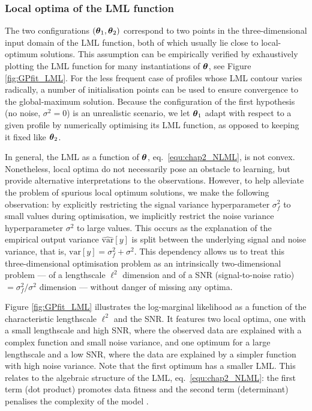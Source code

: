       \subsubsection{Local optima of the LML function}
	The two configurations $(\boldsymbol{\theta}_1, \boldsymbol{\theta}_2)$ correspond to two points
	in the three-dimensional input domain
	of the LML function, both of which usually lie close to local-optimum
	solutions. This assumption can be empirically verified by exhaustively
	plotting the LML function for many instantiations of $\boldsymbol{\theta}$, see Figure
	\ref{fig:GPfit_LML}. For the less frequent case of profiles whose LML contour varies radically, a number of
	initialisation points can be used to ensure convergence to the
	global-maximum solution. Because the configuration of the first
	hypothesis (no noise, $\sigma^2=0$) is an unrealistic scenario, we
	let $\boldsymbol{\theta}_1$ adapt with respect to a given profile by numerically optimising its LML function,
	as opposed to keeping it fixed like $\boldsymbol{\theta}_2$.

	In general, the LML as a function of $\boldsymbol{\theta}$, eq.~\eqref{equ:chap2_NLML}, is not convex.
	Nonetheless, local optima do not necessarily pose an obstacle to learning, but provide
	alternative interpretations to the observations.
	However, to help alleviate the problem of spurious local optimum solutions,
	we make the following observation: by explicitly restricting the
	signal variance hyperparameter $\sigma^2_f$ to small
	values during optimisation, we implicitly restrict the noise variance
	hyperparameter $\sigma^2$ to large values. This occurs as the explanation
	of the empirical output variance $\hat{\textrm{var}}[y]$ is split between
	the underlying signal and noise variance, that is,
	$\hat{\textrm{var}}[y] = \sigma^2_f + \sigma^2$. This dependency allows
	us to treat this three-dimensional optimisation problem as an intrinsically two-dimensional
	problem --- of a lengthscale $\ell^2$ dimension and of a SNR (signal-to-noise ratio)
	$= \sigma^2_f / \sigma^2$ dimension --- without danger of missing any optima.

	Figure \ref{fig:GPfit_LML} illustrates the log-marginal likelihood as a function of
	the characteristic lengthscale $\ell^2$ and the SNR. It features two local
	optima, one with a small lengthscale and high SNR, where the observed data
	are explained with a complex function and small noise variance,
	and one optimum for a large lengthscale and a low SNR, where the data are
	explained by a simpler function with high noise variance.
	Note that the first optimum has a smaller LML. This relates to the algebraic structure of
	the LML, eq.~\eqref{equ:chap2_NLML}: the first term (dot product) promotes data
	fitness and the second term (determinant) penalises the complexity of the
	model \citep[sec.5.4]{Rasmussen:book06}.

